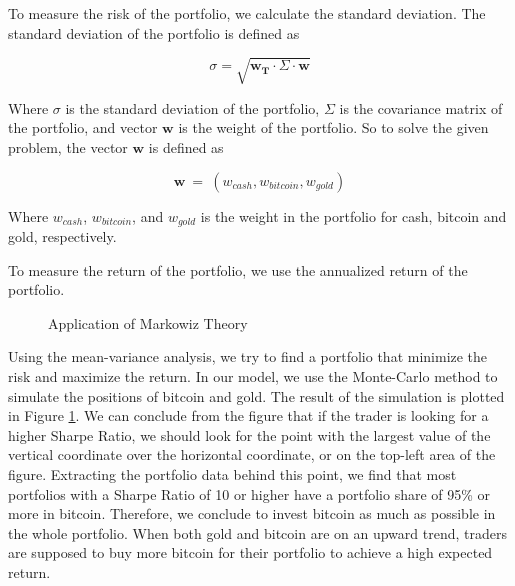 \documentclass[12pt,a4paper]{article}
\begin{document}
\begin{spacing}{1.2}
To measure the risk of the portfolio, we calculate the standard deviation. The standard deviation of the portfolio is defined as

$$
	\sigma = \sqrt{\mathbf{w_T}  \cdot \Sigma \cdot \mathbf{w}}
$$

Where $\sigma$ is the standard deviation of the portfolio, $\Sigma$ is the covariance matrix of the portfolio, and vector $\mathbf{w}$ is the weight of the portfolio. So to solve the given problem, the vector $\mathbf{w}$ is defined as 

$$
\mathbf{w} \ = \ (w_{cash},w_{bitcoin},w_{gold})
$$

Where $w_{cash}$, $w_{bitcoin}$, and $w_{gold}$ is the weight in the portfolio for cash, bitcoin and gold, respectively. 

To measure the return of the portfolio, we use the annualized return of the portfolio.

\begin{figure}[H]
	\caption{Application of Markowiz Theory}
	\label{figure:markowiz}
\end{figure}

Using the mean-variance analysis, we try to find a portfolio that minimize the risk and maximize the return. In our model, we use the Monte-Carlo method to simulate the positions of bitcoin and gold. The result of the simulation is plotted in Figure \ref{figure:markowiz}.
We can conclude from the figure that if the trader is looking for a higher Sharpe Ratio, we should look for the point with the largest value of the vertical coordinate over the horizontal coordinate, or on the top-left area of the figure.
Extracting the portfolio data behind this point, we find that most portfolios with a Sharpe Ratio of 10 or higher have a portfolio share of 95\% or more in bitcoin.
Therefore, we conclude to invest bitcoin as much as possible in the whole portfolio. When both gold and bitcoin are on an upward trend, traders are supposed to buy more bitcoin for their portfolio to achieve a high expected return.



\end{spacing}
\end{document}

